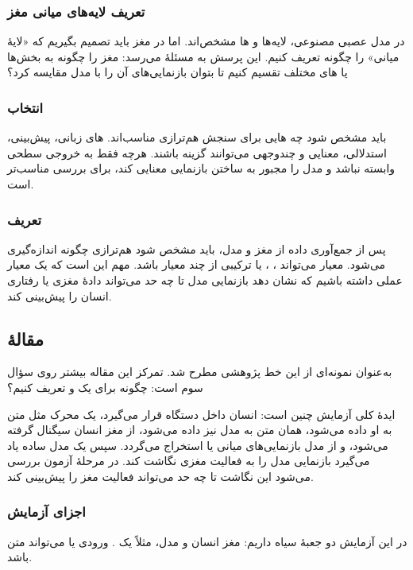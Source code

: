 \subsubsection{تعریف لایه‌های میانی مغز}
در مدل عصبی مصنوعی، لایه‌ها و ها مشخص‌اند. اما در مغز باید تصمیم بگیریم که «لایهٔ میانی» را چگونه تعریف کنیم. این پرسش به مسئلهٔ  می‌رسد: مغز را چگونه به بخش‌ها یا های مختلف تقسیم کنیم تا بتوان بازنمایی‌های آن را با مدل مقایسه کرد؟

\subsubsection{انتخاب }
باید مشخص شود چه هایی برای سنجش هم‌ترازی مناسب‌اند. های زبانی، پیش‌بینی، استدلالی، معنایی و چندوجهی می‌توانند گزینه باشند. هرچه  فقط به خروجی سطحی وابسته نباشد و مدل را مجبور به ساختن بازنمایی معنایی کند، برای بررسی  مناسب‌تر است.

\subsubsection{تعریف }
پس از جمع‌آوری داده از مغز و مدل، باید مشخص شود هم‌ترازی چگونه اندازه‌گیری می‌شود. معیار می‌تواند ، ،  یا ترکیبی از چند معیار باشد. مهم این است که یک معیار عملی داشته باشیم که نشان دهد بازنمایی مدل تا چه حد می‌تواند دادهٔ مغزی یا رفتاری انسان را پیش‌بینی کند.

\subsection{مقالهٔ }
 به‌عنوان نمونه‌ای از این خط پژوهشی مطرح شد. تمرکز این مقاله بیشتر روی سؤال سوم است: چگونه برای  یک  و  تعریف کنیم؟

ایدهٔ کلی آزمایش چنین است: انسان داخل دستگاه  قرار می‌گیرد، یک محرک مثل متن به او داده می‌شود، همان متن به مدل نیز داده می‌شود، از مغز انسان سیگنال  گرفته می‌شود، و از مدل بازنمایی‌های میانی یا  استخراج می‌گردد. سپس یک مدل ساده یاد می‌گیرد بازنمایی مدل را به فعالیت مغزی نگاشت کند. در مرحلهٔ آزمون بررسی می‌شود این نگاشت تا چه حد می‌تواند فعالیت مغز را پیش‌بینی کند.

\subsubsection{اجزای آزمایش}
در این آزمایش دو جعبهٔ سیاه داریم: مغز انسان و مدل، مثلاً یک . ورودی یا  می‌تواند متن باشد.

